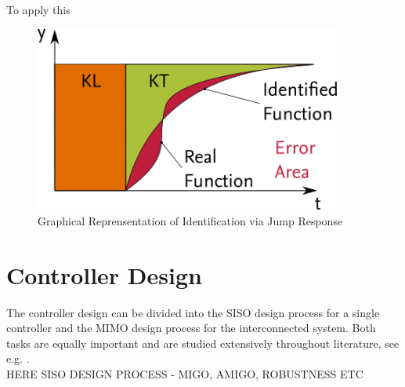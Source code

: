 To apply this 


\begin{figure}[H]
\begin{minipage}[b]{\textwidth}
\centering
\includegraphics[width=0.9\textwidth]{./Graphics/AREA_IDENTIFICATION1.png}
\caption{Graphical Reprensentation of Identification via Jump Response}
\label{c:control:f:2area}
\end{minipage}
\end{figure}

\section{Controller Design}\label{c:control:s:identification}

The controller design can be divided into the SISO design process for a single controller and the MIMO design process for the interconnected system. Both tasks are equally important and are studied extensively throughout literature, see e.g. \cite{Astrom2000a}.\\

HERE SISO DESIGN PROCESS - MIGO, AMIGO, ROBUSTNESS ETC \\

